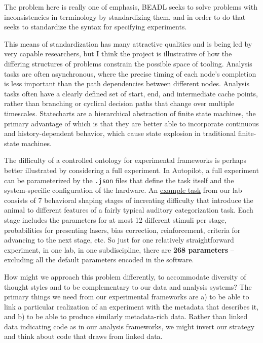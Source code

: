 The problem here is really one of emphasis, BEADL seeks to solve
problems with inconsistencies in terminology by standardizing them, and
in order to do that seeks to standardize the syntax for specifying
experiments.

This means of standardization has many attractive qualities and is being
led by very capable researchers, but I think the project is illustrative
of how the differing structures of problems constrain the possible space
of tooling. Analysis tasks are often asynchronous, where the precise
timing of each node's completion is less important than the path
dependencies between different nodes. Analysis tasks often have a
clearly defined set of start, end, and intermediate cache points, rather
than branching or cyclical decision paths that change over multiple
timescales. Statecharts are a hierarchical abstraction of finite state
machines, the primary advantage of which is that they are better able to
incorporate continuous and history-dependent behavior, which cause state
explosion in traditional finite-state machines.

The difficulty of a controlled ontology for experimental frameworks is
perhaps better illustrated by considering a full experiment. In
Autopilot, a full experiment can be parameterized by the \texttt{.json}
files that define the task itself and the system-specific configuration
of the hardware. An
\href{https://gist.github.com/sneakers-the-rat/eebe675326a157df49f66f62c4e33a6e}{example
task} from our lab consists of 7 behavioral shaping stages of increating
difficulty that introduce the animal to different features of a fairly
typical auditory categorization task. Each stage includes the parameters
for at most 12 different stimuli per stage, probabilities for presenting
lasers, bias correction, reinforcement, criteria for advancing to the
next stage, etc. So just for one relatively straightforward experiment,
in one lab, in one subdiscipline, there are \textbf{268 parameters} --
excluding all the default parameters encoded in the software.

How might we approach this problem differently, to accommodate diversity
of thought styles and to be complementary to our data and analysis
systems? The primary things we need from our experimental frameworks are
a) to be able to link a particular realization of an experiment with the
metadata that describes it, and b) to be able to produce similarly
metadata-rich data. Rather than linked data indicating code as in our
analysis frameworks, we might invert our strategy and think about code
that draws from linked data.

